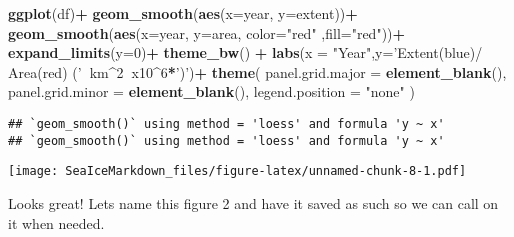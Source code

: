 \documentclass[]{article}
\newenvironment{Shaded}{\begin{snugshade}}{\end{snugshade}}
\newcommand{\KeywordTok}[1]{\textcolor[rgb]{0.13,0.29,0.53}{\textbf{#1}}}
\newcommand{\DataTypeTok}[1]{\textcolor[rgb]{0.13,0.29,0.53}{#1}}
\newcommand{\DecValTok}[1]{\textcolor[rgb]{0.00,0.00,0.81}{#1}}
\newcommand{\StringTok}[1]{\textcolor[rgb]{0.31,0.60,0.02}{#1}}
\newcommand{\OperatorTok}[1]{\textcolor[rgb]{0.81,0.36,0.00}{\textbf{#1}}}
\newcommand{\NormalTok}[1]{#1}
\begin{document}
\begin{Shaded}
\begin{Highlighting}[]
\KeywordTok{ggplot}\NormalTok{(df)}\OperatorTok{+}
\StringTok{  }\KeywordTok{geom_smooth}\NormalTok{(}\KeywordTok{aes}\NormalTok{(}\DataTypeTok{x=}\NormalTok{year, }\DataTypeTok{y=}\NormalTok{extent))}\OperatorTok{+}
\StringTok{  }\KeywordTok{geom_smooth}\NormalTok{(}\KeywordTok{aes}\NormalTok{(}\DataTypeTok{x=}\NormalTok{year, }\DataTypeTok{y=}\NormalTok{area, }\DataTypeTok{color=}\StringTok{"red"}\NormalTok{ ,}\DataTypeTok{fill=}\StringTok{"red"}\NormalTok{))}\OperatorTok{+}
\StringTok{  }\KeywordTok{expand_limits}\NormalTok{(}\DataTypeTok{y=}\DecValTok{0}\NormalTok{)}\OperatorTok{+}
\StringTok{  }\KeywordTok{theme_bw}\NormalTok{() }\OperatorTok{+}
\StringTok{  }\KeywordTok{labs}\NormalTok{(}\DataTypeTok{x =} \StringTok{"Year"}\NormalTok{,}\DataTypeTok{y=}\StringTok{'Extent(blue)/ Area(red) ('}\OperatorTok{~}\NormalTok{km}\OperatorTok{^}\DecValTok{2}\OperatorTok{~}\NormalTok{x10}\OperatorTok{^}\DecValTok{6}\OperatorTok{*}\StringTok{')'}\NormalTok{)}\OperatorTok{+}
\StringTok{  }\KeywordTok{theme}\NormalTok{(}
    \DataTypeTok{panel.grid.major =} \KeywordTok{element_blank}\NormalTok{(),}
    \DataTypeTok{panel.grid.minor =} \KeywordTok{element_blank}\NormalTok{(),}
       \DataTypeTok{legend.position =} \StringTok{"none"}
\NormalTok{  )}
\end{Highlighting}
\end{Shaded}

\begin{verbatim}
## `geom_smooth()` using method = 'loess' and formula 'y ~ x'
## `geom_smooth()` using method = 'loess' and formula 'y ~ x'
\end{verbatim}

\texttt{[image: SeaIceMarkdown\_files/figure-latex/unnamed-chunk-8-1.pdf]}

Looks great! Lets name this figure 2 and have it saved as such so we can
call on it when needed.
\end{document}

